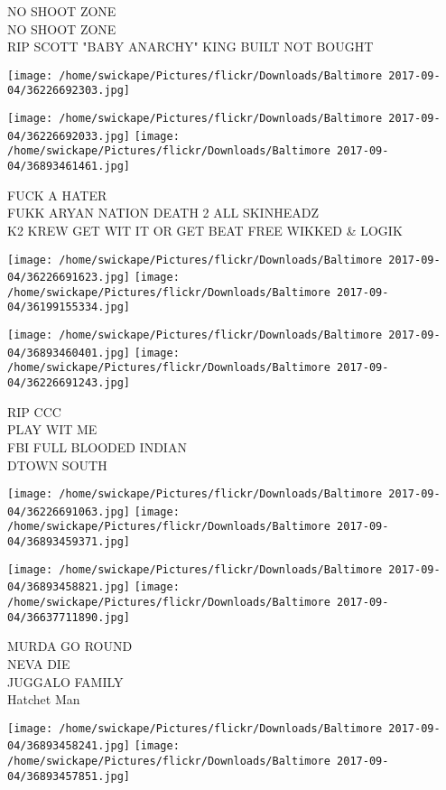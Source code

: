 \documentclass[10pt,letterpaper]{article}
\begin{document}
NO SHOOT ZONE\\
NO SHOOT ZONE\\
RIP SCOTT "BABY ANARCHY" KING BUILT NOT BOUGHT
\pagebreak

\texttt{[image: /home/swickape/Pictures/flickr/Downloads/Baltimore 2017-09-04/36226692303.jpg]}

\vspace{0.25in}
\texttt{[image: /home/swickape/Pictures/flickr/Downloads/Baltimore 2017-09-04/36226692033.jpg]}
\texttt{[image: /home/swickape/Pictures/flickr/Downloads/Baltimore 2017-09-04/36893461461.jpg]}

FUCK A HATER\\
FUKK ARYAN NATION DEATH 2 ALL SKINHEADZ\\
K2 KREW GET WIT IT OR GET BEAT FREE WIKKED \& LOGIK
\pagebreak

\texttt{[image: /home/swickape/Pictures/flickr/Downloads/Baltimore 2017-09-04/36226691623.jpg]}
\texttt{[image: /home/swickape/Pictures/flickr/Downloads/Baltimore 2017-09-04/36199155334.jpg]}

\texttt{[image: /home/swickape/Pictures/flickr/Downloads/Baltimore 2017-09-04/36893460401.jpg]}
\texttt{[image: /home/swickape/Pictures/flickr/Downloads/Baltimore 2017-09-04/36226691243.jpg]}

RIP CCC\\
PLAY WIT ME\\
FBI FULL BLOODED INDIAN\\
DTOWN SOUTH
\pagebreak

\texttt{[image: /home/swickape/Pictures/flickr/Downloads/Baltimore 2017-09-04/36226691063.jpg]}
\texttt{[image: /home/swickape/Pictures/flickr/Downloads/Baltimore 2017-09-04/36893459371.jpg]}

\texttt{[image: /home/swickape/Pictures/flickr/Downloads/Baltimore 2017-09-04/36893458821.jpg]}
\texttt{[image: /home/swickape/Pictures/flickr/Downloads/Baltimore 2017-09-04/36637711890.jpg]}

MURDA GO ROUND\\
NEVA DIE\\
JUGGALO FAMILY\\
Hatchet Man
\pagebreak

\texttt{[image: /home/swickape/Pictures/flickr/Downloads/Baltimore 2017-09-04/36893458241.jpg]}
\texttt{[image: /home/swickape/Pictures/flickr/Downloads/Baltimore 2017-09-04/36893457851.jpg]}
\end{document}
